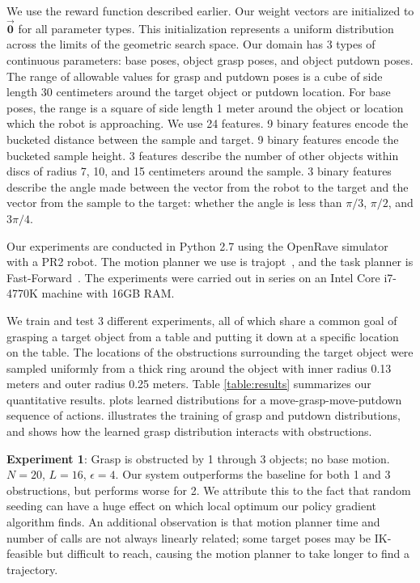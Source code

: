 We use the reward function described earlier. Our weight
vectors are initialized to $\vec{\mathbf{0}}$ for all parameter types.
This initialization represents a uniform distribution across the limits of the geometric search space.
Our domain has 3 types of continuous parameters: base poses, object grasp poses, and object putdown poses.
The range of allowable values for grasp and putdown poses is a cube of side length 30 centimeters
around the target object or putdown location. For base poses, the range is a
square of side length 1 meter around the object or location which the robot is approaching.
We use 24 features. 9 binary features encode the bucketed distance between the sample
and target. 9 binary features encode the bucketed sample height. 3 features
describe the number of other objects within discs of radius 7, 10, and 15 centimeters around the
sample. 3 binary features describe the angle made between the vector from the
robot to the target and the vector from the sample to the target: whether the angle is less than
$\pi/3$, $\pi/2$, and $3\pi/4$.

Our experiments are conducted in Python 2.7 using the OpenRave simulator~\cite{Diankov_2008_6117} with a PR2 robot.
The motion planner we use is trajopt~\cite{schulman2013finding}, and the task planner is Fast-Forward~\cite{FF}.
The experiments were carried out in series on an Intel Core i7-4770K machine
with 16GB RAM.

We train and test 3 different experiments, all of which share a common goal of
grasping a target object from a table and putting it down at a specific location on the table.
The locations of the obstructions surrounding the target object were
sampled uniformly from a thick ring around the object with inner radius 0.13 meters
and outer radius 0.25 meters. Table \ref{table:results} summarizes our quantitative results.
 plots learned distributions for a move-grasp-move-putdown sequence of actions.
 illustrates the training of grasp and putdown distributions, and 
shows how the learned grasp distribution interacts with obstructions.

\textbf{Experiment 1}: Grasp is obstructed by 1 through 3 objects; no base motion.
$N = 20$, $L = 16$, $\epsilon = 4$. Our system outperforms the baseline for both 1 and 3
obstructions, but performs worse for 2. We attribute this to the fact that random seeding can
have a huge effect on which local optimum our policy gradient algorithm finds. An additional
observation is that motion planner time and number of calls are not always linearly related; some target
poses may be IK-feasible but difficult to reach, causing the motion planner to take longer
to find a trajectory.

